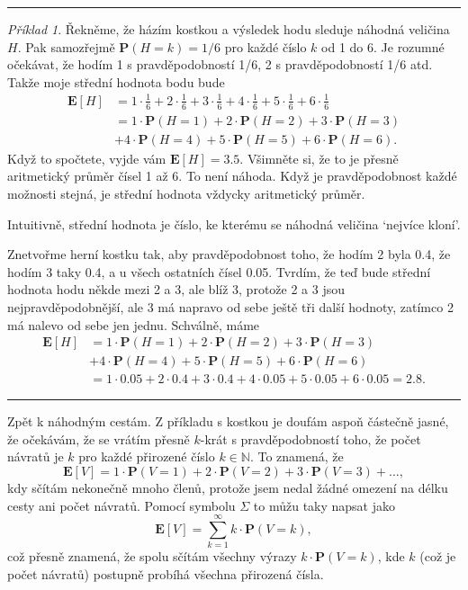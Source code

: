 \documentclass[a4paper,11pt]{article}
\theoremstyle{remark}
\newtheorem*{example}{Příklad}
\newcommand{\N}{\mathbb{N}}
\renewcommand{\P}{\mathbf{P}}
\newcommand{\E}{\mathbf{E}}
\begin{document}
\vspace{\parskip}
\hrule
\begin{example}
 Řekněme, že házím kostkou a výsledek hodu sleduje náhodná veličina $H$. Pak
 samozřejmě $\P(H = k) = 1 / 6$ pro každé číslo $k$ od 1 do 6. Je rozumné
 očekávat, že hodím 1 s pravděpodobností 1/6, 2 s pravděpodobností 1/6 atd.
 Takže moje střední hodnota bodu bude
 \begin{align*}
  \E[H] &= 1 \cdot \frac{1}{6} + 2 \cdot \frac{1}{6} + 3 \cdot \frac{1}{6} + 4
  \cdot \frac{1}{6} + 5 \cdot \frac{1}{6} + 6 \cdot \frac{1}{6}\\
  &= 1 \cdot \P(H = 1) + 2 \cdot \P(H = 2) + 3 \cdot \P(H = 3)\\
  &+4 \cdot \P(H = 4) + 5 \cdot \P(H = 5) + 6 \cdot \P(H = 6).
 \end{align*}
 Když to spočtete, vyjde vám $\E[H] = 3.5$. Všimněte si, že to je přesně
 aritmetický průměr čísel 1 až 6. To není náhoda. Když je pravděpodobnost každé
 možnosti stejná, je střední hodnota vždycky aritmetický průměr.

 Intuitivně, střední hodnota je číslo, ke kterému se náhodná veličina `nejvíce
 kloní'.

 Znetvořme herní kostku tak, aby pravděpodobnost toho, že hodím 2 byla 0.4, že
 hodím 3 taky 0.4, a u všech ostatních čísel 0.05. Tvrdím, že teď bude střední
 hodnota hodu někde mezi 2 a 3, ale blíž 3, protože 2 a 3 jsou
 nejpravděpodobnější, ale 3 má napravo od sebe ještě tři další hodnoty, zatímco
 2 má nalevo od sebe jen jednu. Schválně, máme
 \begin{align*}
  \E[H] &= 1 \cdot \P(H = 1) + 2 \cdot \P(H = 2) + 3 \cdot \P(H = 3)\\
  &+4 \cdot \P(H = 4) + 5 \cdot \P(H = 5) + 6 \cdot \P(H = 6)\\
  &=1 \cdot 0.05 + 2 \cdot 0.4 + 3 \cdot 0.4 + 4 \cdot 0.05 + 5 \cdot 0.05 + 6
  \cdot 0.05 = 2.8.
 \end{align*}
\end{example}
\hrule
\vspace{\parskip}
Zpět k náhodným cestám. Z příkladu s kostkou je doufám aspoň částečně jasné, že
očekávám, že se vrátím přesně $k$-krát s pravděpodobností toho, že počet
návratů je $k$ pro každé přirozené číslo $k \in \N$. To znamená, že
\[
 \E[V] = 1 \cdot \P(V = 1) + 2 \cdot \P(V = 2) + 3 \cdot \P(V = 3) + \ldots,
\]
kdy sčítám nekonečně mnoho členů, protože jsem nedal žádné omezení na délku
cesty ani počet návratů. Pomocí symbolu $\Sigma$ to můžu taky napsat jako
\[
 \E[V] = \sum_{k=1}^{\infty} k \cdot \P(V=k),
\]
což přesně znamená, že spolu sčítám všechny výrazy $k \cdot \P(V=k)$, kde $k$
(což je počet návratů) postupně probíhá všechna přirozená čísla.
\end{document}
